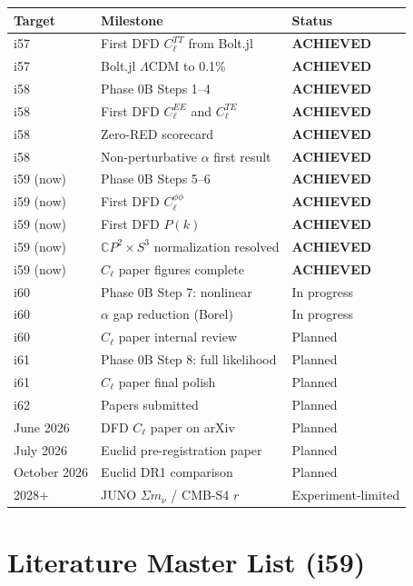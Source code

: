 \documentclass[11pt,a4paper]{article}
\newcommand{\CP}{\mathbb{C}P}
\begin{document}
\begin{center}
\begin{longtable}{lll}
\toprule
\textbf{Target} & \textbf{Milestone} & \textbf{Status} \\
\midrule
i57 & First DFD $C_\ell^{TT}$ from Bolt.jl & \textbf{ACHIEVED} \\
i57 & Bolt.jl $\Lambda$CDM to 0.1\% & \textbf{ACHIEVED} \\
i58 & Phase 0B Steps 1--4 & \textbf{ACHIEVED} \\
i58 & First DFD $C_\ell^{EE}$ and $C_\ell^{TE}$ & \textbf{ACHIEVED} \\
i58 & Zero-RED scorecard & \textbf{ACHIEVED} \\
i58 & Non-perturbative $\alpha$ first result & \textbf{ACHIEVED} \\
i59 (now) & Phase 0B Steps 5--6 & \textbf{ACHIEVED} \\
i59 (now) & First DFD $C_\ell^{\phi\phi}$ & \textbf{ACHIEVED} \\
i59 (now) & First DFD $P(k)$ & \textbf{ACHIEVED} \\
i59 (now) & $\CP^2 \times S^3$ normalization resolved & \textbf{ACHIEVED} \\
i59 (now) & $C_\ell$ paper figures complete & \textbf{ACHIEVED} \\
i60 & Phase 0B Step 7: nonlinear & In progress \\
i60 & $\alpha$ gap reduction (Borel) & In progress \\
i60 & $C_\ell$ paper internal review & Planned \\
i61 & Phase 0B Step 8: full likelihood & Planned \\
i61 & $C_\ell$ paper final polish & Planned \\
i62 & Papers submitted & Planned \\
June 2026 & DFD $C_\ell$ paper on arXiv & Planned \\
July 2026 & Euclid pre-registration paper & Planned \\
October 2026 & Euclid DR1 comparison & Planned \\
2028+ & JUNO $\Sigma m_\nu$ / CMB-S4 $r$ & Experiment-limited \\
\bottomrule
\end{longtable}
\end{center}


\section{Literature Master List (i59)}
\label{sec:literature}
\end{document}
